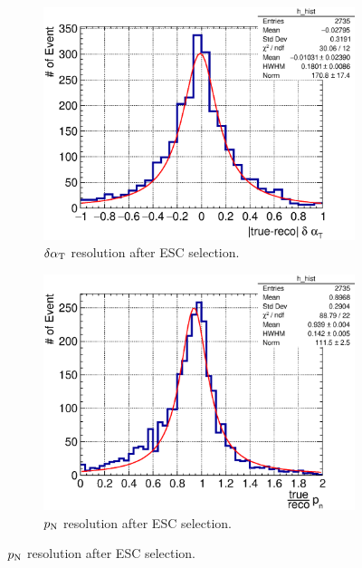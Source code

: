 \begin{figure}[!htb]
           \\
            \begin{subfigure}{0.45\textwidth}
                \includegraphics[width=\textwidth]{figures/dalphat_rat_hist_al14.eps}
                \caption{$\delta\alpha_\textrm{T}$ resolution after ESC selection.}
                \label{fig:dat-res-afESC}
           \end{subfigure}
           \begin{subfigure}{0.45\textwidth}
                \includegraphics[width=\textwidth]{figures/pn_rat_hist_al14.eps}
                \caption{$p_\textrm{N}$ resolution after ESC selection.}
                \label{fig:pn-res-afESC}
           \end{subfigure}

\end{figure}
